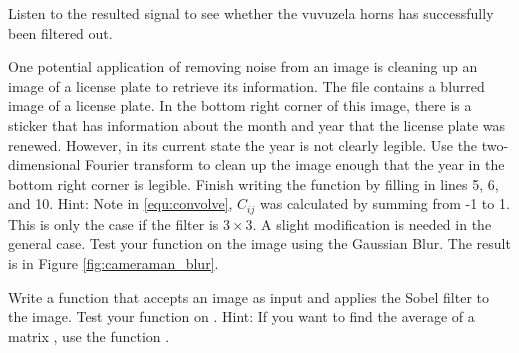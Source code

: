 Listen to the resulted signal to see whether the vuvuzela horns has successfully been filtered out. 


One potential application of removing noise from an image is cleaning up an image of a license plate to retrieve its information. 
The file  contains a blurred image of a license plate. 
In the bottom right corner of this image, there is a sticker that has information about the month and year that the license plate was renewed. 
However, in its current state the year is not clearly legible.
Use the two-dimensional Fourier transform to clean up the image enough that the year in the bottom right corner is legible. 
\label{prob:filter}
\leavevmode
Finish writing the function  by filling in lines 5, 6, and 10.  Hint: Note in \ref{equ:convolve}, $C_{ij}$ was calculated by summing from -1 to 1.  This is only the case if the filter  is $3 \times 3$. A slight modification is needed in the general case.  Test your function on the image  using the Gaussian Blur. The result is in Figure \ref{fig:cameraman_blur}.

Write a function that accepts an image as input and applies the Sobel filter to the image.  Test your function on .  Hint: If you want to find the average of a matrix , use the function .
